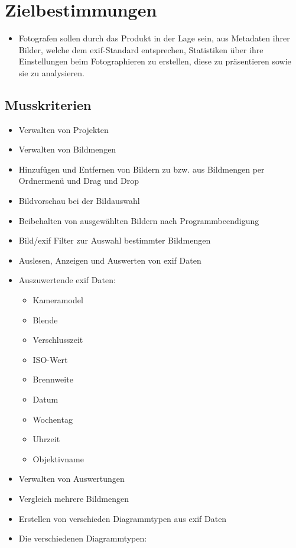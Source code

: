 \section{Zielbestimmungen}
\begin{itemize}
  \item Fotografen sollen durch das Produkt in der Lage sein, aus Metadaten ihrer Bilder, welche dem \gls{exif}-Standard entsprechen, Statistiken über ihre Einstellungen beim Fotographieren zu erstellen, diese zu präsentieren sowie sie zu analysieren.
  \end{itemize} 
\subsection{Musskriterien} 
\begin{itemize}
	\item Verwalten von Projekten
	\item Verwalten von Bildmengen
	\item Hinzufügen und Entfernen von Bildern zu bzw. aus Bildmengen per Ordnermenü und Drag und Drop
	\item Bildvorschau bei der Bildauswahl
	\item Beibehalten von ausgewählten Bildern nach Programmbeendigung
	\item Bild/\gls{exif} Filter zur Auswahl bestimmter Bildmengen
	\item Auslesen, Anzeigen und Auswerten von \gls{exif} Daten
	\item Auszuwertende \gls{exif} Daten:
	\label{subsec:auszuwertendedaten}
			\begin{itemize}
			\item Kameramodel
			\item Blende 
			\item Verschlusszeit
			\item ISO-Wert
			\item Brennweite
			\item Datum
			\item Wochentag
			\item Uhrzeit
			\item Objektivname
		\end{itemize}
	\item Verwalten von Auswertungen
	\item Vergleich mehrere Bildmengen
	\item Erstellen von verschieden Diagrammtypen aus \gls{exif} Daten
	\item Die verschiedenen Diagrammtypen:

\end{itemize}
